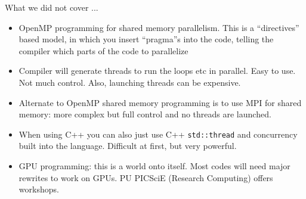 \documentclass[aspectratio=169]{beamer}
\newcommand{\mypause}{\pause}
\begin{document}
\begin{frame}{What we did not cover ...}
  \begin{itemize}
  \item OpenMP programming for shared memory parallelism. This is a
    ``directives'' based model, in which you insert ``pragma''s into
    the code, telling the compiler which parts of the code to
    parallelize
  \item Compiler will generate threads to run the loops etc in
    parallel. Easy to use. Not much control. Also, launching threads
    can be expensive.%
    \mypause%
  \item Alternate to OpenMP shared memory programming is to use MPI
    for shared memory: more complex but full control and no threads
    are launched.
  \item When using C++ you can also just use C++ {\tt std::thread} and
    concurrency built into the language. Difficult at first, but very
    powerful.%
    \mypause%
  \item GPU programming: this is a world onto itself. Most codes will
    need major rewrites to work on GPUs. PU PICSciE (Research
    Computing) offers workshops.
  \end{itemize}
\end{frame}
\end{document}
